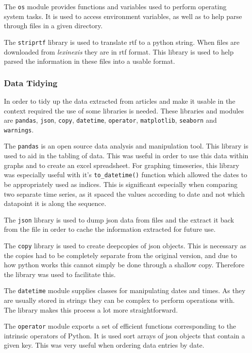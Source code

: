 The \verb|os| module provides functions and variables used to perform operating system tasks. It is used to access environment variables, as well as to help parse through files in a given directory.

The \verb|striprtf| library is used to translate rtf to a python string. When files are downloaded from \emph{lexinexis} they are in rtf format. This library is used to help parsed the information in these files into a usable format.

\subsubsection{Data Tidying}

In order to tidy up the data extracted from articles and make it usable in the context required the use of some libraries is needed. These libraries and modules are \verb|pandas|, \verb|json|, \verb|copy|, \verb|datetime|, \verb|operator|, \verb|matplotlib|, \verb|seaborn| and \verb|warnings|.

The \verb|pandas| is an open source data analysis and manipulation tool. This library is used to aid in the tabling of data. This was useful in order to use this data within graphs and to create an excel spreadsheet. For graphing timeseries, this library was especially useful with it's \verb|to_datetime()| function which allowed the dates to be appropriately used as indices. This is significant especially when comparing two separate time series, as it spaced the values according to date and not which datapoint it is along the sequence.

The \verb|json| library is used to dump json data from files and the extract it back from the file in order to cache the information extracted for future use.

The \verb|copy| library is used to create deepcopies of json objects. This is necessary as the copies had to be completely separate from the original version, and due to how python works this cannot simply be done through a shallow copy. Therefore the library was used to facilitate this.

The \verb|datetime| module supplies classes for manipulating dates and times. As they are usually stored in strings they can be complex to perform operations with. The library makes this process a lot more straightforward.

The \verb|operator| module exports a set of efficient functions corresponding to the intrinsic operators of Python. It is used sort arrays of json objects that contain a given key. This was very useful when ordering data entries by date.

